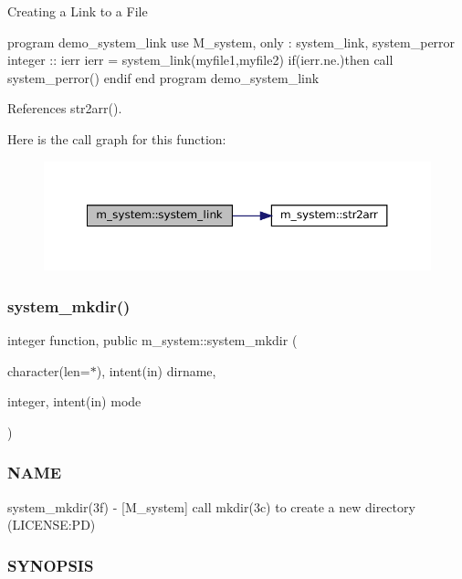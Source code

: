 Creating a Link to a File

program demo\+\_\+system\+\_\+link use M\+\_\+system, only \+: system\+\_\+link, system\+\_\+perror integer \+:\+: ierr ierr = system\+\_\+link(\textquotesingle{}myfile1\textquotesingle{},\textquotesingle{}myfile2\textquotesingle{}) if(ierr.\+ne.)then call system\+\_\+perror(\textquotesingle{}) endif end program demo\+\_\+system\+\_\+link 

References str2arr().

Here is the call graph for this function\+:
\nopagebreak
\begin{figure}[H]
\begin{center}
\leavevmode
\includegraphics[width=350pt]{namespacem__system_aa77d9c9ae68750f515ba3d04d022c43c_cgraph}
\end{center}
\end{figure}
\mbox{\label{namespacem__system_a084d644c236d22af2cc75c6e48fd6e96}} 
\subsubsection{\texorpdfstring{system\+\_\+mkdir()}{system\_mkdir()}}
{\footnotesize\ttfamily integer function, public m\+\_\+system\+::system\+\_\+mkdir (\begin{DoxyParamCaption}\item[{character(len=$\ast$), intent(in)}]{dirname,  }\item[{integer, intent(in)}]{mode }\end{DoxyParamCaption})}



\subsubsection*{N\+A\+ME}

system\+\_\+mkdir(3f) -\/ \mbox{[}M\+\_\+system\mbox{]} call mkdir(3c) to create a new directory (L\+I\+C\+E\+N\+SE\+:PD) \subsubsection*{S\+Y\+N\+O\+P\+S\+IS}

